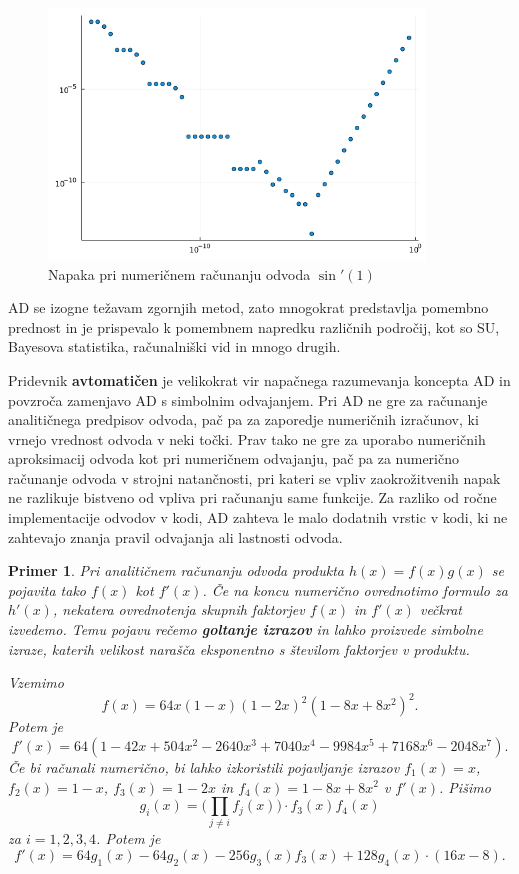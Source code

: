 \documentclass[12pt,slovene]{article}
\newtheorem{primer}{Primer}
\begin{document}
\begin{figure}[h]
    \centering
    \includegraphics[width=10cm]{napaka_odvod.png}
    \caption{Napaka pri numeričnem računanju odvoda $\sin'(1)$}
    \label{fig:napaka_odvod}
\end{figure}


AD se izogne težavam zgornjih metod, zato mnogokrat predstavlja pomembno prednost in je prispevalo k pomembnem napredku različnih področij, kot so SU, Bayesova statistika, računalniški vid in mnogo drugih.

Pridevnik \textbf{avtomatičen} je velikokrat vir napačnega razumevanja koncepta AD in povzroča zamenjavo AD s simbolnim odvajanjem.
Pri AD ne gre za računanje analitičnega predpisov odvoda, pač pa za zaporedje numeričnih izračunov, ki vrnejo vrednost odvoda v neki točki. Prav tako ne gre za uporabo numeričnih aproksimacij odvoda kot pri numeričnem odvajanju, pač pa za numerično računanje odvoda v strojni natančnosti, pri kateri se vpliv zaokrožitvenih napak ne razlikuje bistveno od vpliva pri računanju same funkcije. Za razliko od ročne implementacije odvodov v kodi, AD zahteva le malo dodatnih vrstic v kodi, ki ne zahtevajo znanja pravil odvajanja ali lastnosti odvoda.

\begin{primer}
Pri analitičnem računanju odvoda produkta $h(x)=f(x)g(x)$
se pojavita tako $f(x)$ kot $f'(x)$. Če 
na koncu numerično ovrednotimo formulo za $h'(x)$, nekatera ovrednotenja skupnih faktorjev $f(x)$ in $f'(x)$ večkrat izvedemo. Temu pojavu rečemo \textbf{goltanje izrazov} in lahko proizvede simbolne izraze, katerih velikost narašča eksponentno s številom faktorjev v produktu.

Vzemimo
    $$f(x)=64x(1-x)(1-2x)^2(1-8x+8x^2)^2.$$
Potem je
    $$f'(x)=64(1-42x+504x^2-2640x^3+7040x^4-9984x^5+7168x^6-2048x^7).$$
Če bi računali numerično, bi lahko izkoristili pojavljanje izrazov $f_{1}(x)=x$, $f_{2}(x)=1-x$, $f_3(x)=1-2x$ in $f_4(x)=1-8x+8x^2$ v $f'(x)$.
Pišimo 
    $$g_i(x)=\big(\prod_{j\neq i}f_j(x)\big)\cdot f_3(x)f_4(x)$$ 
    za $i=1,2,3,4$. Potem je
    $$f'(x)=64g_{1}(x)-64g_{2}(x)-256g_3(x)f_3(x)+128g_4(x)\cdot(16x-8).$$
\end{primer}
\end{document}
